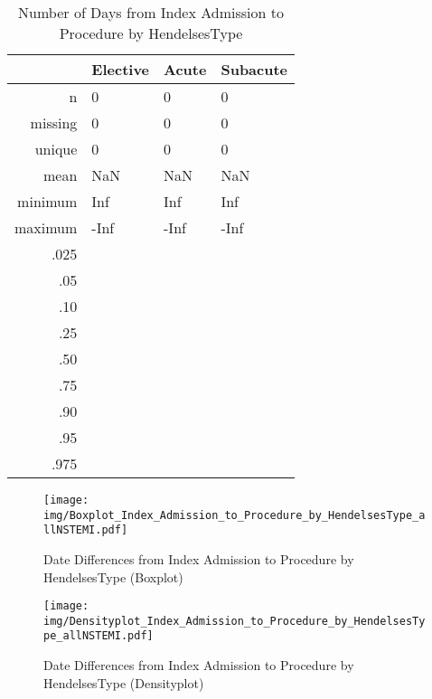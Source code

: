 \documentclass[a4paper]{report}
\begin{document}
\begin{itemize}
{%
\begin{table}[ht]
\centering
\begin{tabular}{rlll}
  \toprule
 & Elective & Acute & Subacute \\ 
  \midrule
n & 0 & 0 & 0 \\ 
  missing & 0 & 0 & 0 \\ 
  unique & 0 & 0 & 0 \\ 
  mean & NaN & NaN & NaN \\ 
  minimum & Inf & Inf & Inf \\ 
  maximum & -Inf & -Inf & -Inf \\ 
  .025 &  &  &  \\ 
  .05 &  &  &  \\ 
  .10 &  &  &  \\ 
  .25 &  &  &  \\ 
  .50 &  &  &  \\ 
  .75 &  &  &  \\ 
  .90 &  &  &  \\ 
  .95 &  &  &  \\ 
  .975 &  &  &  \\ 
   \bottomrule
\end{tabular}
\caption{Number of Days from Index Admission to Procedure by HendelsesType} 
\end{table}
\begin{figure}
  \centering
  \caption{Date Differences from Index Admission to Procedure by HendelsesType (Boxplot)}
  \label{Boxplot: Date Differences from Index Admission to Procedure by HendelsesType}
\texttt{[image: img/Boxplot\_Index\_Admission\_to\_Procedure\_by\_HendelsesType\_allNSTEMI.pdf]}\end{figure}


\begin{figure}
  \centering
  \caption{Date Differences from Index Admission to Procedure by HendelsesType (Densityplot)}
  \label{Density: Date Differences from Index Admission to Procedure by HendelsesType}
\texttt{[image: img/Densityplot\_Index\_Admission\_to\_Procedure\_by\_HendelsesType\_allNSTEMI.pdf]}\end{figure}



\clearpage

}
\end{itemize}
\end{document}
